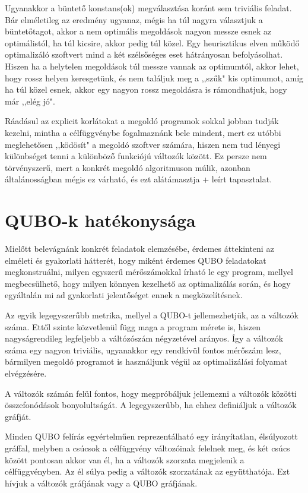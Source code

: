 Ugyanakkor a büntető konstans(ok) megválasztása koránt sem triviális feladat. Bár elméletileg az eredmény ugyanaz, mégis ha túl nagyra választjuk a büntetőtagot, akkor a nem optimális megoldások nagyon messze esnek az optimálistól, ha túl kicsire, akkor pedig túl közel. Egy heurisztikus elven működő optimalizáló szoftvert mind a két szélsőséges eset hátrányosan befolyásolhat. Hiszen ha a helytelen megoldások túl messze vannak az optimumtól, akkor lehet, hogy rossz helyen keresgetünk, és nem találjuk meg a ,,szűk" kis optimumot, amíg ha túl közel esnek, akkor egy nagyon rossz megoldásra is rámondhatjuk, hogy már ,,elég jó".

Ráadásul az explicit korlátokat a megoldó programok sokkal jobban tudják kezelni, mintha a célfüggvénybe fogalmaznánk bele mindent, mert ez utóbbi meglehetősen ,,ködösít" a megoldó szoftver számára, hiszen nem tud lényegi különbséget tenni a különböző funkciójú változók között. Ez persze nem törvényszerű, mert a konkrét megoldó algoritmuson múlik, azonban általánosságban mégis ez várható, és ezt alátámasztja \az+ leírt tapasztalat.

\section{QUBO-k hatékonysága}\label{sec:QUBOform}

Mielőtt belevágnánk konkrét feladatok elemzésébe, érdemes áttekinteni az elméleti és gyakorlati hátterét, hogy miként érdemes QUBO feladatokat megkonstruálni, milyen egyszerű mérőszámokkal írható le egy program, mellyel megbecsülhető, hogy milyen könnyen kezelhető az optimalizálás során, és hogy egyáltalán mi ad gyakorlati jelentőséget ennek a megközelítésnek.

Az egyik legegyszerűbb metrika, mellyel a QUBO-t jellemezhetjük, az a változók száma. Ettől szinte közvetlenül függ maga a program mérete is, hiszen nagyságrendileg legfeljebb a váltózószám négyzetével arányos. Így a változók száma egy nagyon triviális, ugyanakkor egy rendkívül fontos mérőszám lesz, bármilyen megoldó programot is használjunk végül az optimalizálási folyamat elvégzésére.

A változók számán felül fontos, hogy megpróbáljuk jellemezni a változók közötti összefonódások bonyolultságát. A legegyszerűbb, ha ehhez definiáljuk a változók gráfját.

\begin{definition}\label{def:valtozokgrafja}
	Minden QUBO felírás egyértelműen reprezentálható egy irányítatlan, élsúlyozott gráffal, melyben a csúcsok a célfüggvény változóinak felelnek meg, és két csúcs között pontosan akkor van él, ha a változók szorzata megjelenik a célfüggvényben. Az él súlya pedig a változók szorzatának az együtthatója. Ezt hívjuk a változók gráfjának vagy a QUBO gráfjának.
\end{definition}


